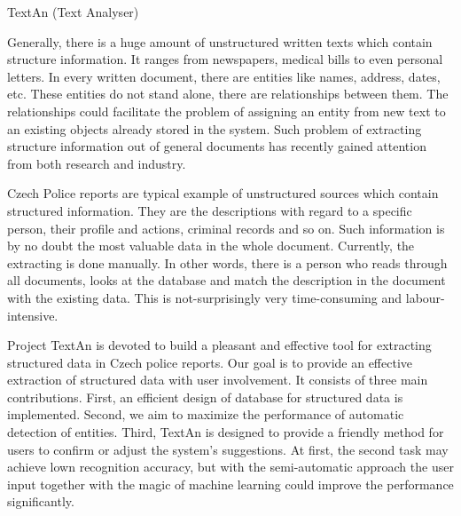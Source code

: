 TextAn (Text Analyser)

Generally, there is a huge amount of unstructured written texts which contain structure information.
It ranges from newspapers, medical bills to even personal letters.
In every written document, there are entities like names, address, dates, etc.
These entities do not stand alone, there are relationships between them.
The relationships could facilitate the problem of assigning an entity from new text to an existing objects already stored in the system.
Such problem of extracting structure information out of general documents has recently gained attention from both research and industry.

Czech Police reports are typical example of unstructured sources which contain structured information.
They are the descriptions with regard to a specific person, their profile and actions, criminal records and so on.
Such information is by no doubt the most valuable data in the whole document.
Currently, the extracting is done manually.
In other words, there is a person who reads through all documents,
looks at the database and match the description in the document with the existing data.
This is not-surprisingly very time-consuming and labour-intensive. 

Project TextAn is devoted to build a pleasant and effective tool for extracting structured data in Czech police reports. 
Our goal is to provide an effective extraction of structured data with user involvement.
It consists of three main contributions.
First, an efficient design of database for structured data is implemented.
Second, we aim to maximize the performance of automatic detection of entities.
Third, TextAn is designed to provide a friendly method for users to confirm or adjust the system's suggestions.
At first, the second task may achieve lown recognition accuracy,
but with the semi-automatic approach the user input together with the magic of machine learning could improve the performance significantly. 

